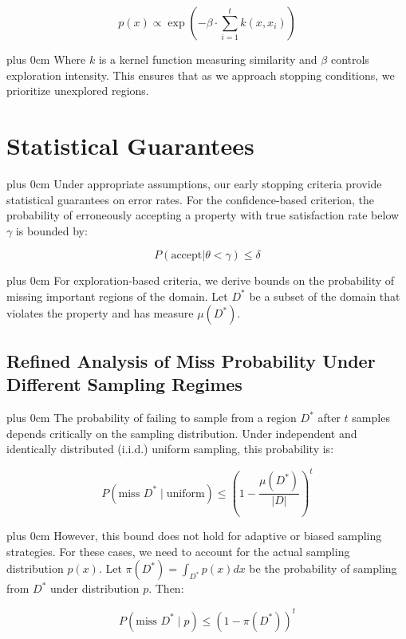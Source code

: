\documentclass[conference]{IEEEtran}
\newcommand{\justifytext}{\leftskip=0pt \rightskip=0pt plus 0cm}
\begin{document}
\begin{equation}
p(x) \propto \exp\left(-\beta \cdot \sum_{i=1}^t k(x, x_i)\right)
\end{equation}

\justifytext
Where $k$ is a kernel function measuring similarity and $\beta$ controls exploration intensity. This ensures that as we approach stopping conditions, we prioritize unexplored regions.

\section{Statistical Guarantees}

\justifytext
Under appropriate assumptions, our early stopping criteria provide statistical guarantees on error rates. For the confidence-based criterion, the probability of erroneously accepting a property with true satisfaction rate below $\gamma$ is bounded by:

\begin{equation}
P(\text{accept} | \theta < \gamma) \leq \delta
\end{equation}

\justifytext
For exploration-based criteria, we derive bounds on the probability of missing important regions of the domain. Let $D^*$ be a subset of the domain that violates the property and has measure $\mu(D^*)$. 

\subsection{Refined Analysis of Miss Probability Under Different Sampling Regimes}

\justifytext
The probability of failing to sample from a region $D^*$ after $t$ samples depends critically on the sampling distribution. Under independent and identically distributed (i.i.d.) uniform sampling, this probability is:

\begin{equation}
P(\text{miss } D^* \mid \text{uniform}) \leq \left(1 - \frac{\mu(D^*)}{|D|}\right)^t
\end{equation}

\justifytext
However, this bound does not hold for adaptive or biased sampling strategies. For these cases, we need to account for the actual sampling distribution $p(x)$. Let $\pi(D^*) = \int_{D^*} p(x) dx$ be the probability of sampling from $D^*$ under distribution $p$. Then:

\begin{equation}
P(\text{miss } D^* \mid p) \leq (1 - \pi(D^*))^t
\end{equation}
\end{document}
